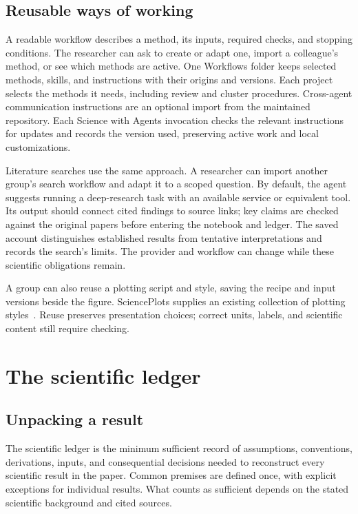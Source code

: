 \documentclass[11pt]{article}
\begin{document}
\subsection{Reusable ways of working}
A readable workflow describes a method, its inputs, required checks, and stopping conditions. The researcher can ask to create or adapt one, import a colleague's method, or see which methods are active. One Workflows folder keeps selected methods, skills, and instructions with their origins and versions. Each project selects the methods it needs, including review and cluster procedures. Cross-agent communication instructions are an optional import from the maintained repository. Each Science with Agents invocation checks the relevant instructions for updates and records the version used, preserving active work and local customizations.

Literature searches use the same approach. A researcher can import another group's search workflow and adapt it to a scoped question. By default, the agent suggests running a deep-research task with an available service or equivalent tool. Its output should connect cited findings to source links; key claims are checked against the original papers before entering the notebook and ledger. The saved account distinguishes established results from tentative interpretations and records the search's limits. The provider and workflow can change while these scientific obligations remain.

A group can also reuse a plotting script and style, saving the recipe and input versions beside the figure. SciencePlots supplies an existing collection of plotting styles~\cite{scienceplots}. Reuse preserves presentation choices; correct units, labels, and scientific content still require checking.

\section{The scientific ledger}
\subsection{Unpacking a result}
The scientific ledger is the minimum sufficient record of assumptions, conventions, derivations, inputs, and consequential decisions needed to reconstruct every scientific result in the paper. Common premises are defined once, with explicit exceptions for individual results. What counts as sufficient depends on the stated scientific background and cited sources.
\end{document}
